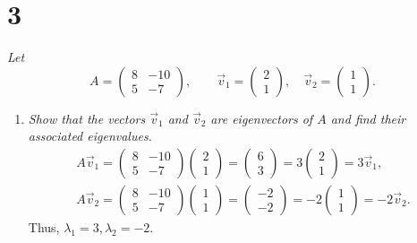\documentclass[12pt]{article}
\begin{document}
\section*{3}
\textit{Let}
\begin{equation*}
	A = \begin{pmatrix} 8 & -10 \\ 5 & -7 \end{pmatrix},
	\qquad
	\vec{v}_1 = \begin{pmatrix} 2 \\ 1 \end{pmatrix}, \quad
	\vec{v}_2 = \begin{pmatrix} 1 \\ 1 \end{pmatrix}.
\end{equation*}
\begin{enumerate}[label=(\alph*)]
	\item \textit{Show that the vectors $\vec{v}_1$ and $\vec{v}_2$ are
	eigenvectors of $A$ and find their associated eigenvalues.}
	\begin{gather*}
		A \vec{v}_1
		=
		\begin{pmatrix} 8 & -10 \\ 5 & -7 \end{pmatrix}
		\begin{pmatrix} 2 \\ 1 \end{pmatrix}
		=
		\begin{pmatrix} 6 \\ 3 \end{pmatrix}
		=
		3 \begin{pmatrix} 2 \\ 1 \end{pmatrix}
		=
		3 \vec{v}_1
		, \\
		A \vec{v}_2
		=
		\begin{pmatrix} 8 & -10 \\ 5 & -7 \end{pmatrix}
		\begin{pmatrix} 1 \\ 1 \end{pmatrix}
		=
		\begin{pmatrix} -2 \\ -2 \end{pmatrix}
		=
		-2 \begin{pmatrix} 1 \\ 1 \end{pmatrix}
		=
		-2 \vec{v}_2
		.
	\end{gather*}
	Thus, $\boxed{\lambda_1 = 3}, \boxed{\lambda_2 = -2}$.
	

\end{enumerate}
\end{document}
